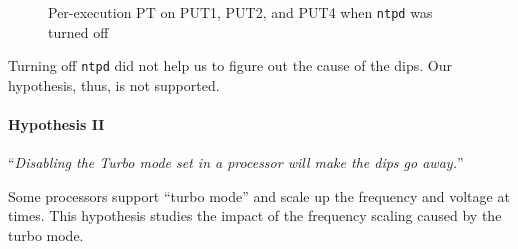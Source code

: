 \documentclass[10pt]{article}
\begin{document}
\begin{figure}[H]
{	}
	\caption{Per-execution PT on PUT1, PUT2, and PUT4 when {\tt ntpd} was turned off~\label{fig:ntpd_off_pt}}
\end{figure}

Turning off {\tt ntpd} did not help us to figure out the cause of the dips. 
Our hypothesis, thus, is not supported.

\paragraph{Hypothesis II} ``{\it Disabling the Turbo mode set in a processor will make the dips go away.}''

Some processors support ``turbo mode'' and scale up the frequency and voltage at times. 
This hypothesis studies the impact of the frequency scaling caused by the turbo mode. 

\end{document}
